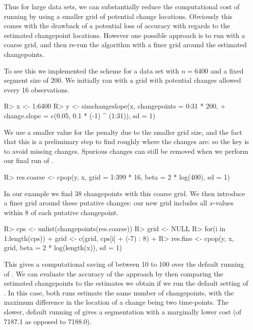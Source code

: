 \documentclass[article]{jss}
\begin{document}
Thus for large data sets, we can substantially reduce the computational cost of running  by using a smaller grid of potential change locations. Obviously this comes with the drawback of a potential loss of accuracy with regards to the estimated changepoint locations. However one possible approach is to run  with a coarse grid, and then re-run the algorithm with a finer grid around the estimated changepoints.

To see this we implemented the scheme for a data set with $n=6400$ and a fixed segment size of 200.  We initially ran  with a grid with potential changes allowed every 16 observations.
\begin{CodeChunk}
\begin{CodeInput}
R> x <- 1:6400
R> y <- simchangeslope(x, changepoints = 0:31 * 200, 
+ change.slope = c(0.05, 0.1 * (-1) ^ (1:31)), sd = 1)
\end{CodeInput}
\end{CodeChunk}

We use a smaller value for the penalty due to the smaller grid size, and the fact that this is a preliminary step to find roughly where the changes are: so the key is to avoid missing changes. Spurious changes can still be removed when we perform our final run of . 
\begin{CodeChunk}
\begin{CodeInput}
R> res.coarse <- cpop(y, x, grid = 1:399 * 16, beta = 2 * log(400), sd = 1)
\end{CodeInput}
\end{CodeChunk}

In our example we find 38 changepoints with this coarse grid. We then introduce a finer grid around these putative changes: our new grid includes all $x$-values within 8 of each putative changepoint.
\begin{CodeChunk}
\begin{CodeInput}
R> cps <- unlist(changepoints(res.coarse))
R> grid <- NULL
R> for(i in 1:length(cps)) {
+   grid <- c(grid, cps[i] + (-7) : 8)
+ }
R> res.fine <- cpop(y, x, grid, beta = 2 * log(length(x)), sd = 1)
\end{CodeInput}
\end{CodeChunk}

This gives a computational saving of between 10 to 100 over the default running of . We can evaluate the accuracy of the approach by then comparing the estimated changepoints to the estimates we obtain if we run the default setting of . In this case, both runs estimate the same number of changepoints, with the maximum difference in the location of a change being two time-points. The slower, default running of  gives a segmentation with a marginally lower cost (of 7187.1 as opposed to 7188.0).
\end{document}
